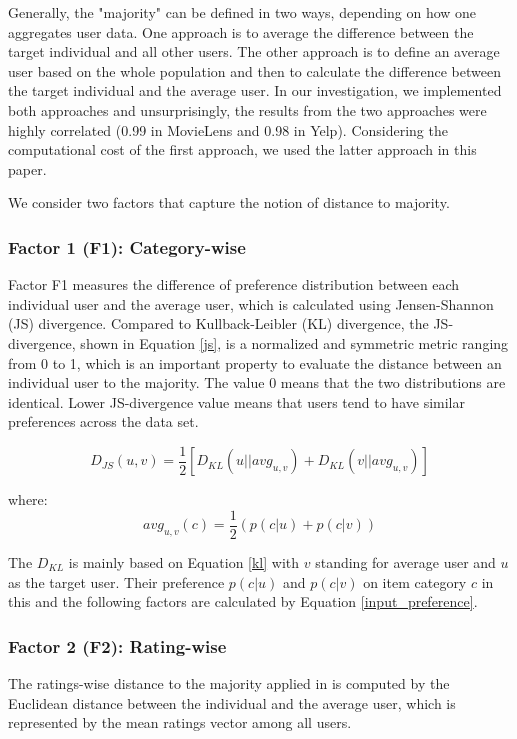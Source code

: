 Generally, the "majority" can be defined in two ways, depending on how one aggregates user data. One approach is to average the difference between the target individual and all other users. The other approach is to define an average user based on the whole population and then to calculate the difference between the target individual and the average user. In our investigation, we implemented both approaches and unsurprisingly, the results from the two approaches were highly correlated (0.99 in MovieLens and 0.98 in Yelp). Considering the computational cost of the first approach, we used the latter approach in this paper.

We consider two factors that capture the notion of distance to majority.

\subsubsection{Factor 1 (F1): Category-wise}
Factor F1 measures the difference of preference distribution between each individual user and the average user, which is calculated using Jensen-Shannon (JS) divergence. Compared to Kullback-Leibler (KL) divergence, the JS-divergence, shown in Equation \ref{js}, is a normalized and symmetric metric ranging from 0 to 1, which is an important property to evaluate the distance between an individual user to the majority. The value 0 means that the two distributions are identical. Lower JS-divergence value means that users tend to have similar preferences across the data set.

\begin{equation} \label{js}
    D_{JS}(u, v) = \frac12[D_{KL}(u || avg_{u,v})+D_{KL}(v || avg_{u,v})]
\end{equation}

where: 
\begin{equation}
    avg_{u,v}(c) = \frac12(p(c|u) + p(c|v))
\end{equation}

The $D_{KL}$ is mainly based on Equation \ref{kl} with $v$ standing for average user and $u$ as the target user. Their preference $p(c|u)$ and $p(c|v)$ on item category $c$ in this and the following factors are calculated by Equation \ref{input_preference}.

\subsubsection{Factor 2 (F2): Rating-wise}
The ratings-wise distance to the majority applied in \cite{eskandanian2019power} is computed by the Euclidean distance between the individual and the average user, which is represented by the mean ratings vector among all users.

